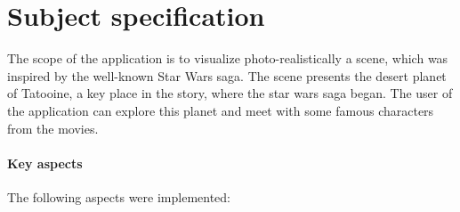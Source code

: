 \chapter{Subject specification} 

The scope of the application is to visualize photo-realistically a scene, which was inspired by the well-known Star Wars saga. The scene presents the desert planet of Tatooine, a key place in the story, where the star wars saga began. The user of the application can explore this planet and meet with some famous characters from the movies.

\subsubsection{Key aspects}

The following aspects were implemented:

